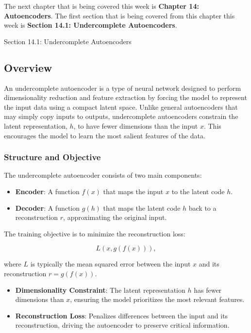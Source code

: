 The next chapter that is being covered this week is \textbf{Chapter 14: Autoencoders}. The first section that is being covered from this chapter this week is \textbf{Section 14.1: Undercomplete Autoencoders}.

\begin{notes}{Section 14.1: Undercomplete Autoencoders}
    \subsection*{Overview}

    An undercomplete autoencoder is a type of neural network designed to perform dimensionality reduction and feature extraction by forcing the model to represent the input data using a compact latent 
    space. Unlike general autoencoders that may simply copy inputs to outputs, undercomplete autoencoders constrain the latent representation, $h$, to have fewer dimensions than the input $x$. 
    This encourages the model to learn the most salient features of the data.
    
    \subsubsection*{Structure and Objective}
    
    The undercomplete autoencoder consists of two main components:
    \begin{itemize}
        \item \textbf{Encoder}: A function $f(x)$ that maps the input $x$ to the latent code $h$.
        \item \textbf{Decoder}: A function $g(h)$ that maps the latent code $h$ back to a reconstruction $r$, approximating the original input.
    \end{itemize}
    
    The training objective is to minimize the reconstruction loss:
    
    \[
    L(x, g(f(x))),
    \]
    
    where $L$ is typically the mean squared error between the input $x$ and its reconstruction $r = g(f(x))$.
    
    \begin{highlight}
        \begin{itemize}
            \item \textbf{Dimensionality Constraint}: The latent representation $h$ has fewer dimensions than $x$, ensuring the model prioritizes the most relevant features.
            \item \textbf{Reconstruction Loss}: Penalizes differences between the input and its reconstruction, driving the autoencoder to preserve critical information.
        \end{itemize}
    \end{highlight}
    

\end{notes}
